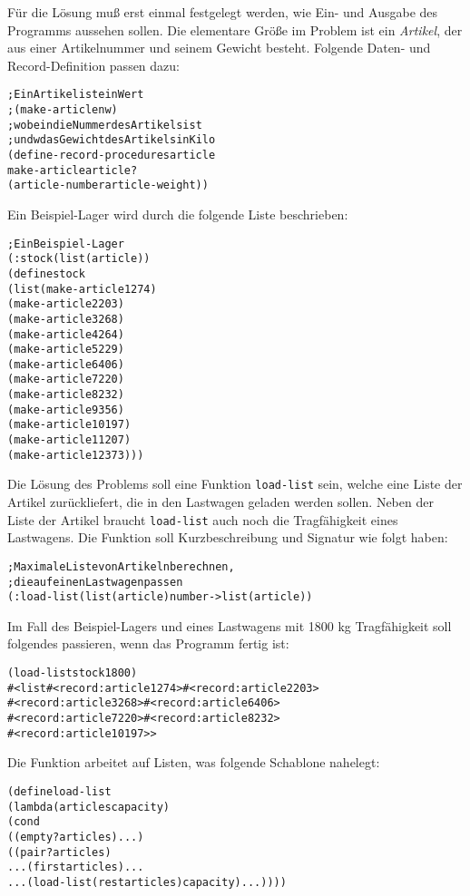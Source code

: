 Für die Lösung muß erst einmal festgelegt werden, wie Ein- und Ausgabe
des Programms aussehen sollen.  Die elementare Größe im Problem ist
ein \textit{Artikel}, der aus einer Artikelnummer und seinem Gewicht
besteht.  Folgende Daten- und Record-Definition passen dazu:
%
\begin{alltt}
; Ein Artikel ist ein Wert
;  (make-article n w)
; wobei n die Nummer des Artikels ist
; und w das Gewicht des Artikels in Kilo
(define-record-procedures article
  make-article article?
  (article-number article-weight))
\end{alltt}
%
Ein Beispiel-Lager wird durch die folgende
Liste beschrieben:
%
\begin{alltt}
; Ein Beispiel-Lager
(: stock (list(article))
(define stock
  (list (make-article 1 274)
        (make-article 2 203)
        (make-article 3 268)
        (make-article 4 264)
        (make-article 5 229)
        (make-article 6 406)
        (make-article 7 220)
        (make-article 8 232)
        (make-article 9 356)
        (make-article 10 197)
        (make-article 11 207)
        (make-article 12 373)))
\end{alltt}
%
Die Lösung des Problems soll eine Funktion \texttt{load-list}
sein, welche eine Liste der Artikel zurückliefert, die in den Lastwagen geladen
werden sollen.  Neben der Liste der Artikel braucht
\texttt{load-list} auch noch die Tragfähigkeit eines Lastwagens.  Die
Funktion soll Kurzbeschreibung und Signatur wie folgt haben:
%
\begin{alltt}
; Maximale Liste von Artikeln berechnen, 
; die auf einen Lastwagen passen
(: load-list (list(article) number -> list(article))
\end{alltt}
%
Im Fall des Beispiel-Lagers und eines Lastwagens mit 1800 kg Tragfähigkeit
soll folgendes
passieren, wenn das Programm fertig ist:
%
\begin{alltt}
(load-list stock 1800)
\evalsto{} #<list #<record:article 1 274> #<record:article 2 203>
          #<record:article 3 268> #<record:article 6 406>
          #<record:article 7 220> #<record:article 8 232> 
          #<record:article 10 197>>
\end{alltt}
%
Die Funktion arbeitet auf Listen, was folgende Schablone nahelegt:
%
\begin{alltt}
(define load-list
  (lambda (articles capacity)
    (cond
     ((empty? articles) ...)
     ((pair? articles)
      ... (first articles) ...
      ... (load-list (rest articles) capacity) ...))))
\end{alltt}
